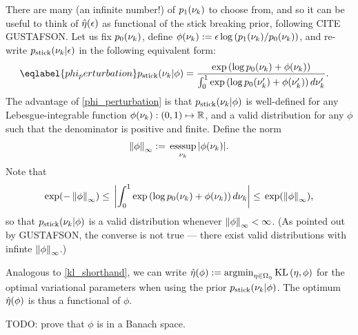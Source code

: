 There are many (an infinite number!) of $p_{1}(\nu_{k})$ to choose from, and
so it can be useful to think of $\hat\eta(\epsilon)$ as functional of the
stick breaking prior, following CITE GUSTAFSON.  Let us fix $p_{0}(\nu_{k})$,
define $\phi(\nu_{k}) := \epsilon \log \left(p_{1}(\nu_{k}) / p_{0}(\nu_{k})\right)$,
and re-write $p_{\mathrm{stick}}(\nu_{k} \vert \epsilon)$ in the following equivalent
form:
%
\begin{align}\eqlabel{phi_perturbation}
%
\pstick(\nuk \vert \phi) ={}&
\frac{\exp\left(\log \pb(\nuk) + \phi(\nuk)\right)}
     {\int_0^1 \exp\left(\log \pb(\nuk') + \phi(\nuk')\right) d\nuk'}.
%
\end{align}
%
The advantage of \eqref{phi_perturbation} is that $p_{\mathrm{stick}}(\nu_{k} \vert \phi)$ is
well-defined for any Lebesgue-integrable function $\phi(\nu_{k}):
(0,1)\mapsto\mathbb{R}$, and a valid distribution for any $\phi$ such that the
denominator is positive and finite.  Define the norm
%
\begin{align*}
%
\norminf{\phi} :={} \esssup_{\nuk} |\phi(\nuk)|.
%
\end{align*}
%
Note that
%
\begin{align*}
%
\exp(-\norminf{\phi}) \le{}
\abs{\int_0^1 \exp\left(\log \pb(\nuk) + \phi(\nuk)\right) d\nuk}
\le{}
\exp(\norminf{\phi}),
%
\end{align*}
%
so that $p_{\mathrm{stick}}(\nu_{k} \vert \phi)$ is a valid distribution whenever
$\left\Vert\phi\right\Vert_{\infty} < \infty$.  (As pointed out by GUSTAFSON, the
converse is not true --- there exist valid distributions with infinte
$\left\Vert\phi\right\Vert_{\infty}$.)

Analogous to \eqref{kl_shorthand}, we can write $\hat\eta(\phi) := \operatorname*{\mathrm{argmin}}_{\eta
\in \Omega_{\eta}} \mathrm{KL}\left(\eta, \phi\right)$ for the optimal variational parameters when
using the prior $p_{\mathrm{stick}}(\nu_{k} \vert \phi)$.  The optimum $\hat\eta(\phi)$
is thus a functional of $\phi$.

TODO: prove that $\phi$ is in a Banach space.


